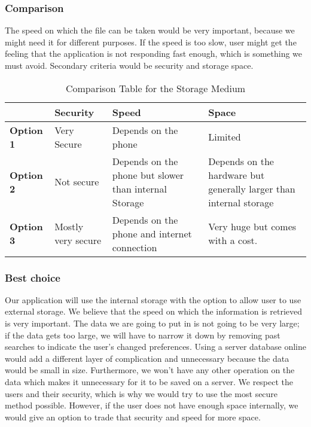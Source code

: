 \documentclass[journal,compsoc, 10pt, draftclsnofoot, onecolumn]{IEEEtran}
\begin{document}
\subsubsection{Comparison}
The speed on which the file can be taken would be very important, because we might
need it for different purposes. If the speed is too slow, user might get the feeling
that the application is not responding fast enough, which is something we must avoid.
Secondary criteria would be security and storage space.

\begin{table}[h]
	\centering
	\caption{Comparison Table for the Storage Medium}
	\label{Comparison Table for the Storage Medium}
	\begin{tabularx}{\textwidth}{|X|X|X|X|}
		\hline
\textbf{}         & \textbf{Security}                & \textbf{Speed} &\textbf{Space}		\\ \hline
		\textbf{Option 1} & Very Secure & Depends on the phone & Limited
		\\ \hline
\textbf{Option 2} & Not secure & Depends on the phone but slower than internal
Storage & Depends on the hardware but generally larger than internal storage
		\\ \hline
\textbf{Option 3} & Mostly very secure &Depends on the phone and internet connection
& Very huge but comes with a cost.
		\\ \hline
	\end{tabularx}
\end{table}

\subsubsection{Best choice}
Our application will use the internal storage with the option to allow user to use
external storage. We believe that the speed on which the information is retrieved is
very important. The data we are going to put in is not going to be very large; if the
data gets too large, we will have to narrow it down by removing past searches to
indicate the user's changed preferences. Using a server database online would add a
different layer of complication and unnecessary because the data would be small in
size. Furthermore, we won't have any other operation on the data which makes it
unnecessary for it to be saved on a server. We respect the users and their security,
which is why we would try to use the most secure method possible. However, if the
user does not have enough space internally, we would give an option to trade that
security and speed for more space.
\end{document}
